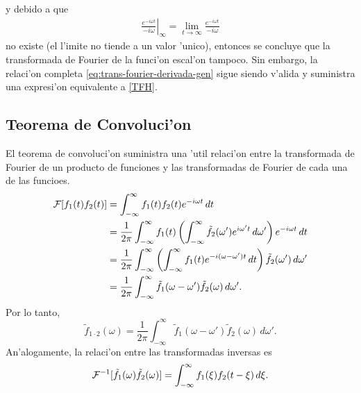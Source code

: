 y debido a que
\begin{align}
\left.\frac{e^{-i\omega t}}{-i\omega}\right|_{\infty}=\lim_{t \rightarrow \infty}\frac{e^{-i\omega t}}{-i\omega}
\end{align}
no existe (el l'imite no tiende a un valor 'unico), entonces se concluye que la transformada de Fourier de la funci'on escal'on tampoco. Sin embargo, la relaci'on  completa \eqref{eq:trans-fourier-derivada-gen} sigue siendo v'alida y suministra una expresi'on equivalente a \eqref{TFH}.
%
\subsection{Teorema de Convoluci'on}
El teorema de convoluci'on suministra una 'util relaci'on entre la transformada de Fourier de un producto de funciones y las transformadas de Fourier de cada una de las funcioes.
\begin{align}
{\cal F}[f_1(t)f_2(t)]
 &=\int_{-\infty}^\infty f_1(t)f_2(t) e^{-i\omega t}\,dt \\
 &=\frac{1}{2\pi}\int_{-\infty}^\infty f_1(t) \left(\int_{-\infty}^\infty\tilde{f}_2(\omega')
 e^{i\omega' t}\,d\omega'\right)e^{-i\omega t}\,dt \\
 &=\frac{1}{2\pi}\int_{-\infty}^\infty\left(\int_{-\infty}^\infty f_1(t) 
 e^{-i(\omega-\omega')t}\,dt\right)\tilde{f}_2(\omega')\,d\omega' \\
 &=\frac{1}{2\pi} \int_{-\infty}^\infty\tilde{f}_1(\omega-\omega')\tilde{f}_2(\omega)\,d\omega'.
\end{align}
Por lo tanto, 
\begin{equation}
\boxed{ \tilde{f}_{1\cdot 2}(\omega)=\frac{1}{2\pi} \int_{-\infty}^\infty\tilde{f}_1(\omega-\omega')\tilde{f}_2(\omega)\,d\omega' .
 } 
\end{equation}   
An'alogamente, la relaci'on entre las transformadas inversas es
\begin{equation}
{\cal F}^{-1}[\tilde{f}_1(\omega)\tilde{f}_2(\omega)]
=\int_{-\infty}^\infty f_1(\xi)f_2(t-\xi)\,d\xi .	
\end{equation}



